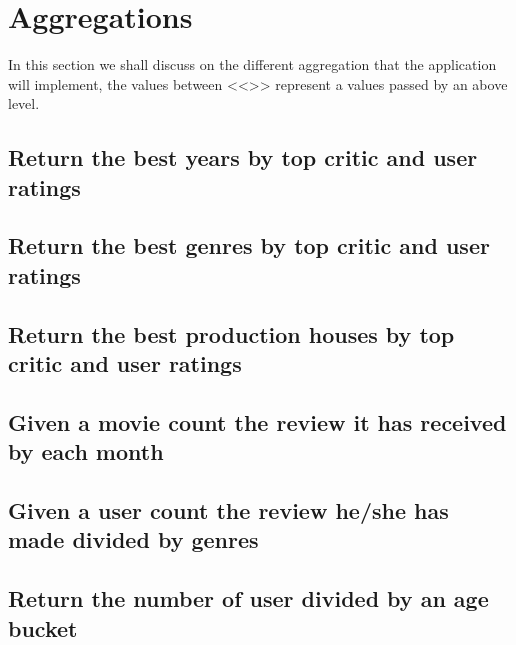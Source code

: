 \section{Aggregations}
In this section we shall discuss on the different aggregation that the application will implement, the values between <<>> represent a values passed by an above level.
\subsection{Return the best years by top critic and user ratings}\label{subsec:bestYear}


\subsection{Return the best genres by top critic and user ratings}\label{subsec:HOFGenres}


\subsection{Return the best production houses by top critic and user ratings}\label{subsec:productionHouses}


\subsection{Given a movie count the review it has received by each month}\label{subsec:reviewByYearMonth}


\subsection{Given a user count the review he/she has made divided by genres}\label{subsec:preferredGenres}


\subsection{Return the number of user divided by an age bucket}\label{subsec:userPopulationBucket}

 